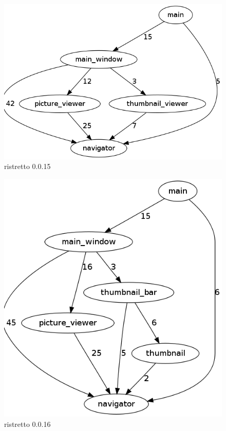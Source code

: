\begin{figure}[h]
\center
\includegraphics[scale=0.4]{imagens/ristretto-0_0_15-doxyparse-2}
\caption{ristretto 0.0.15}
\label{fig:ristretto-0.0.15-doxyparse-2-anexo}
\end{figure}

\begin{figure}[h]
\center
\includegraphics[scale=0.4]{imagens/ristretto-0_0_16-doxyparse-2}
\caption{ristretto 0.0.16}
\label{fig:ristretto-0.0.16-doxyparse-2-anexo}
\end{figure}

